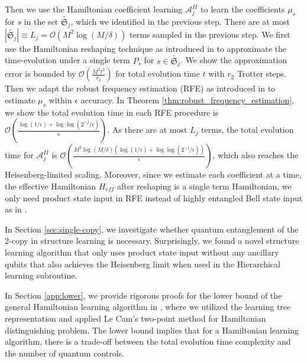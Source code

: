 \documentclass[twocolumn,superscriptaddress,aps,showpacs,amsmath,amstex,amssymb,citeautoscript,floatfix,pra,preprintnumbers]{revtex4-2}
\newcounter{alg}
\theoremstyle{plain}
\theoremstyle{plain}
\theoremstyle{plain}
\theoremstyle{plain}
\theoremstyle{plain}
\theoremstyle{plain}
\begin{document}
\begin{appendix}
Then we use the Hamiltonian coefficient learning $\mathcal{A}^{II}_j$ to learn the coefficients $\mu_s$ for $s$ in the set $\widetilde{\mathfrak{S}_{j}}$, which we identified in the previous step. There are at most $|\widetilde{\mathfrak{S}_{j}}|\equiv L_j=\mathcal{O}(M^2\log(M/\delta))$ terms sampled in the previous step. We first use the Hamiltonian reshaping technique as introduced in  to approximate the time-evolution under a single term $P_s$ for $s\in \widetilde{\mathfrak{S}_{j}}$. We show the approximation error is bounded by $\mathcal{O}(\frac{M^2t^2}{r_2})$ for total evolution time $t$ with $r_2$ Trotter steps. Then we adapt the robust frequency estimation (RFE) as introduced in  to estimate $\mu_s$ within $\epsilon$ accuracy. In Theorem \ref{thm:robust_frequency_estimation}, we show the total evolution time in each RFE procedure is $\mathcal{O}(\frac{\log(1/\epsilon)+\log \log(2^{-j}/\epsilon)}{\epsilon})$. As there are at most $L_j$ terms, the total evolution time for $\mathcal{A}_j^{II}$ is $\mathcal{O}(\frac{M^2\log(M/\delta)(\log(1/\epsilon)+\log \log(2^{-j}/\epsilon))}{\epsilon})$, which also reaches the Heisenberg-limited scaling. Moreover, since we estimate each coefficient at a time, the effective Hamiltonian $H_{eff}$ after reshaping is a single term Hamiltonian, we only need product state input in RFE instead of highly entangled Bell state input as in \cite{ma2024learningkbodyhamiltonianscompressed}.

In Section \ref{sec:single-copy}, we investigate whether quantum entanglement of the 2-copy in structure learning is necessary. Surprisingly, we found a novel structure learning algorithm that only uses product state input without any ancillary qubits that also achieves the Heisenberg limit when used in the Hierarchical learning subroutine.

In Section \ref{app:lower}, we provide rigorous proofs for the lower bound of the general Hamiltonian learning algorithm in , where we utilized the learning tree representation and applied Le Cam's two-point method for Hamiltonian distinguishing problem. The lower bound implies that for a Hamiltonian learning algorithm, there is a trade-off between the total evolution time complexity and the number of quantum controls.




\end{appendix}
\end{document}
